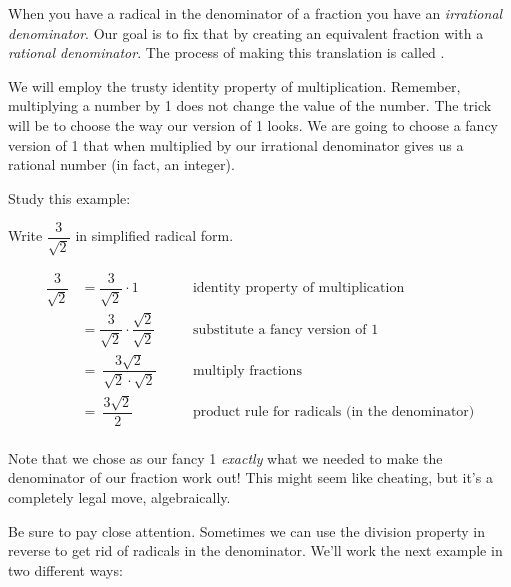 When you have a radical in the denominator of a fraction you have an \textit{irrational denominator}. Our goal is to fix that by creating an equivalent fraction with a \textit{rational denominator}. The process of making this translation is called .

We will employ the trusty \gls{identity property of multiplication}. Remember, multiplying a number by 1 does not change the value of the number. The trick will be to choose the way our version of 1 looks. We are going to choose a fancy version of 1 that when multiplied by our irrational denominator gives us a rational number (in fact, an integer).

Study this example:

\begin{boxedex}
Write $\dfrac{3}{\sqrt{2}}$ in simplified radical form.

\bigskip{}
\[\begin{aligned}
\dfrac{3}{\sqrt{2}} &= \dfrac{3}{\sqrt{2}} \cdot 1
&&\quad\text{identity property of multiplication}\\
&= \dfrac{3}{\sqrt{2}} \cdot \dfrac{\sqrt{2}}{\sqrt{2}}
&&\quad\text{substitute a fancy version of 1}\\
&=~ \dfrac{3 \sqrt{2}}{\sqrt{2} \cdot \sqrt{2}}
&&\quad\text{multiply fractions}\\
&=~ \dfrac{3 \sqrt{2}}{2}
&&\quad\text{product rule for radicals (in the denominator)}\\
\end{aligned}
\]
\end{boxedex}

Note that we chose as our fancy 1 \textit{exactly} what we needed to make the denominator of our fraction work out! This might seem like cheating, but it's a completely legal move, algebraically.

Be sure to pay close attention. Sometimes we can use the division property in reverse to get rid of radicals in the denominator. We'll work the next example in two different ways:

